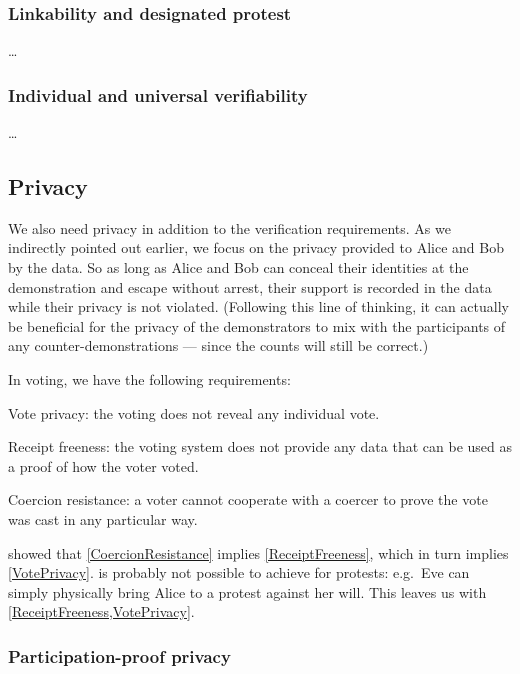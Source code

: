 \subsubsection{Linkability and designated protest}

\dots

\subsubsection{Individual and universal verifiability}

\dots

\subsection{Privacy}%
\label{Privacy}

We also need privacy in addition to the verification requirements.
As we indirectly pointed out earlier, we focus on the privacy provided to Alice 
and Bob by the data.
So as long as Alice and Bob can conceal their identities at the demonstration 
and escape without arrest, their support is recorded in the data while their 
privacy is not violated.
(Following this line of thinking, it can actually be beneficial for the privacy 
of the demonstrators to mix with the participants of any counter-demonstrations 
--- since the counts will still be correct.)

In voting, we have the following requirements:
\begin{requirements}[P]
\item\label{VotePrivacy} Vote privacy: the voting does not reveal any 
  individual vote.
\item\label{ReceiptFreeness} Receipt freeness: the voting system does not 
  provide any data that can be used as a proof of how the voter voted.
\item\label{CoercionResistance} Coercion resistance: a voter cannot cooperate 
  with a coercer to prove the vote was cast in any particular way.
\end{requirements}
 showed that 
\cref{CoercionResistance} implies \cref{ReceiptFreeness}, which in turn implies
\cref{VotePrivacy}.
 is probably not possible to achieve for protests:
e.g.\ Eve can simply physically bring Alice to a protest against her will.
This leaves us with \cref{ReceiptFreeness,VotePrivacy}.

\subsubsection{Participation-proof privacy}

